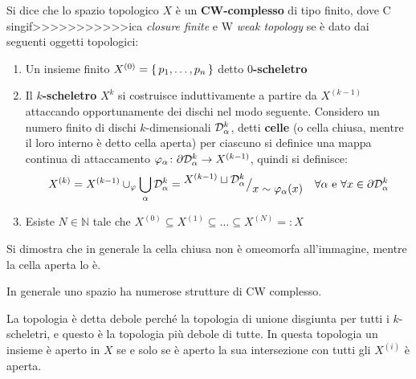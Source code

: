 \begin{definition}
  Si dice che lo spazio topologico $ X $ è un \textbf{CW-complesso} di tipo finito,
  dove C singif>>>>>>>>>>>ica \emph{closure finite} e W \emph{weak topology} se è dato dai seguenti oggetti topologici:
  \begin{enumerate}
  \item Un insieme finito $ X^{(0)} = \set{p_1, \dots, p_n} $ detto \textbf{$ 0 $-scheletro}
  \item Il \textbf{$ k $-scheletro} $ X^{k} $ si costruisce induttivamente
    a partire da $ X^{(k-1)} $ attaccando opportunamente dei dischi nel modo seguente.
    Considero un numero finito di dischi $ k $-dimensionali $ \mathcal{D}^{k}_\alpha $,
    detti \textbf{celle} (o cella chiusa, mentre
    il loro interno è detto cella aperta) per ciascuno si definice una mappa
    continua di attaccamento $ \varphi_\alpha \colon \partial\mathcal{D}^{k}_\alpha \to X^{(k-1)} $, quindi si definisce:
    \[
      X^{(k)} = X^{(k-1)} \cup_\varphi \bigcup_\alpha \mathcal{D}^{k}_\alpha = {^{\textstyle  X^{(k-1)} \sqcup \mathcal{D}^{k}_\alpha}\big/_{\textstyle x \sim \varphi_\alpha(x)}} \quad \forall \alpha \text{ e }
      \forall x \in \partial \mathcal{D}^{k}_\alpha
    \]
  \item Esiste $ N \in \mathbb{N} $ tale che $ X^{(0)} \subseteq X^{(1)} \subseteq \dots \subseteq X^{(N)} =: X $
  \end{enumerate}
\end{definition}

Si dimostra che in generale la cella chiusa non è omeomorfa all'immagine, mentre la cella
aperta lo è.

In generale uno spazio ha numerose strutture di CW complesso.

La topologia è detta debole perché la topologia di unione disgiunta per tutti i $ k $-scheletri,
e questo è la topologia più debole di tutte. In questa topologia un insieme è aperto in $ X $
se e solo se è aperto la sua intersezione con tutti gli $ X^{(i)} $ è aperta.


